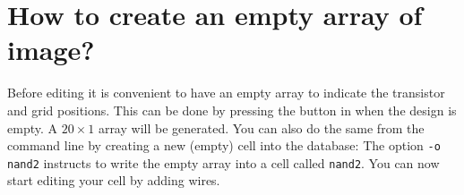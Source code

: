 \section{How to create an empty array of image?}
Before editing it is convenient to have an empty array to indicate the
transistor and grid positions.  This can be done by pressing the button
 in  when the design is empty. A $20 \times
1$ array will be generated.  You can also do the same from the command
line by creating a new (empty) cell into the database:
The option {\tt -o nand2} instructs  to write the empty
array into a cell called {\tt nand2}.
You can now start editing your cell by adding wires.


\cleardoublepage
